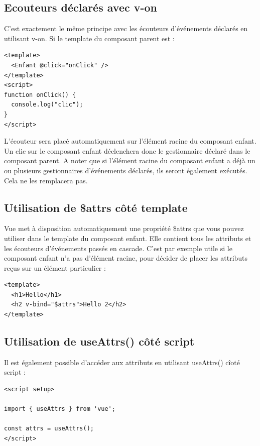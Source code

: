 \documentclass{article}
\begin{document}
\subsection{Ecouteurs déclarés avec {\color{monOrange}v-on}}
C'est exactement le même principe avec les écouteurs d'événements déclarés en utilisant {\color{monOrange}v-on}. Si le {\color{monOrange}template} du composant parent est :
\begin{verbatim}
<template>
  <Enfant @click="onClick" />
</template>
<script>
function onClick() {
  console.log("clic");
}
</script>
\end{verbatim}
L'écouteur sera placé automatiquement sur l'élément racine du composant enfant. Un clic sur le composant enfant déclenchera donc le gestionnaire déclaré dans le composant parent. A noter que si l'élément racine du composant enfant a déjà un ou plusieurs gestionnaires d'événements déclarés, ils seront également exécutés. Cela ne les remplacera pas.

\subsection{Utilisation de {\color{monOrange}\$attrs} côté {\color{monOrange}template}}
{\color{monOrange}Vue} met à disposition automatiquement une propriété {\color{monOrange}\$attrs} que vous pouvez utiliser dans le {\color{monOrange}template} du composant enfant. Elle contient tous les attributs et les écouteurs d'événements passés en cascade. C'est par exemple utile si le composant enfant n'a pas d'élément racine, pour décider de placer les attributs reçus sur un élément particulier :
\begin{verbatim}
<template>
  <h1>Hello</h1>
  <h2 v-bind="$attrs">Hello 2</h2>
</template>
\end{verbatim}
\subsection{Utilisation de {\color{monOrange}useAttrs()} côté {\color{monOrange}script}}
Il est également possible d'accéder aux attributs en utilisant {\color{monOrange}useAttrs()} cîoté {\color{monOrange}script} :
\begin{verbatim}
<script setup>
  
import { useAttrs } from 'vue';

const attrs = useAttrs();
</script>
\end{verbatim}
\end{document}
